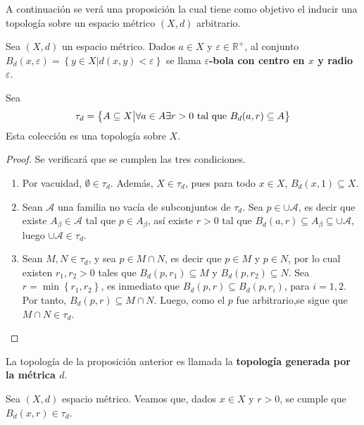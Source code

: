 \documentclass[12pt]{report}
\theoremstyle{largebreak}
\begin{document}
    A continuación se verá una proposición la cual tiene como objetivo el inducir una topología sobre un espacio métrico $(X,d)$ arbitrario.

    \begin{propo}
        Sea $(X,d)$ un espacio métrico. Dados $a\in X$ y $\varepsilon\in\mathbb{R}^+$, al conjunto $B_d(x,\varepsilon)=\left\{y\in X\big|d(x,y)<\varepsilon \right\}$ se llama \textbf{$\varepsilon$-bola con centro en $x$ y radio $\varepsilon$}. 
        
        Sea
        \begin{equation*}
            \tau_d=\left\{A\subseteq X\big| \forall a\in A \exists r>0\textup{ tal que }B_d(a,r)\subseteq A \right\}
        \end{equation*}
        Esta colección es una topología sobre $X$.
    \end{propo}

    \begin{proof}
        Se verificará que se cumplen las tres condiciones.
        \begin{enumerate}
            \item Por vacuidad, $\emptyset\in\tau_d$. Además, $X\in\tau_d$, pues para todo $x\in X$, $B_d(x,1)\subseteq X$.
            \item Sean $\mathcal{A}$ una familia no vacía de subconjuntos de $\tau_d$. Sea $p\in\cup\mathcal{A}$, es decir que existe $A_\beta\in\mathcal{A}$ tal que $p\in A_\beta$, así existe $r>0$ tal que $B_d(a,r)\subseteq A_\beta\subseteq\cup\mathcal{A}$, luego $\cup\mathcal{A}\in\tau_d$.
            \item Sean $M,N\in\tau_d$, y sea $p\in M\cap N$, es decir que $p\in M$ y $p\in N$, por lo cual existen $r_1,r_2>0$ tales que $B_d(p,r_1)\subseteq M$ y $B_d(p,r_2)\subseteq N$. Sea $r=\min\left\{r_1,r_2\right\}$, es inmediato que $B_d(p,r)\subseteq B_d(p,r_i)$, para $i=1,2$. Por tanto, $B_d(p,r)\subseteq M\cap N$. Luego, como el $p$ fue arbitrario,se sigue que $M\cap N\in \tau_d$.
        \end{enumerate}
    \end{proof}

    \begin{mydef}
        La topología de la proposición anterior es llamada la \textbf{topología generada por la métrica $d$}.
    \end{mydef}

    \begin{excer}
        Sea $(X,d)$ espacio métrico. Veamos que, dados $x\in X$ y $r>0$, se cumple que $B_d(x,r)\in\tau_d$.
    \end{excer}
\end{document}
